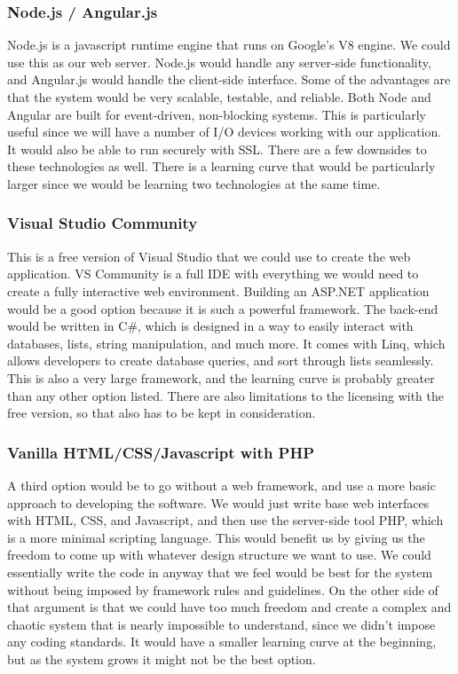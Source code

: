 \documentclass[10pt, onecolumn, twoside, peerreview]{IEEEtran}
\begin{document}
\subsubsection{Node.js / Angular.js}
Node.js is a javascript runtime engine that runs on Google’s V8 engine. We could use this as our web server. Node.js
would handle any server-side functionality, and Angular.js would handle the client-side interface. Some of the
advantages are that the system would be very scalable, testable, and reliable. Both Node and Angular are built for
event-driven, non-blocking systems. This is particularly useful since we will have a number of I/O devices working with
our application. It would also be able to run securely with SSL. There are a few downsides to these technologies as
well. There is a learning curve that would be particularly larger since we would be learning two technologies at the
same time.\\

\subsubsection{Visual Studio Community} This is a free version of Visual Studio that we could use to create the web
application. VS Community is a full IDE with everything we would need to create a fully interactive web environment.
Building an ASP.NET application would be a good option because it is such a powerful framework. The back-end would be
written in C\#, which is designed in a way to easily interact with databases, lists, string manipulation, and much
more. It comes with Linq, which allows developers to create database queries, and sort through lists seamlessly. This
is also a very large framework, and the learning curve is probably greater than any other option listed. There are also
limitations to the licensing with the free version, so that also has to be kept in consideration.\\

\subsubsection{Vanilla HTML/CSS/Javascript with PHP}
A third option would be to go without a web framework, and use a more basic approach to developing the software. We
would just write base web interfaces with HTML, CSS, and Javascript, and then use the server-side tool PHP, which is a
more minimal scripting language. This would benefit us by giving us the freedom to come up with whatever design
structure we want to use. We could essentially write the code in anyway that we feel would be best for the system
without being imposed by framework rules and guidelines. On the other side of that argument is that we could have too
much freedom and create a complex and chaotic system that is nearly impossible to understand, since we didn’t impose
any coding standards. It would have a smaller learning curve at the beginning, but as the system grows it might not be
the best option.\\
\end{document}
